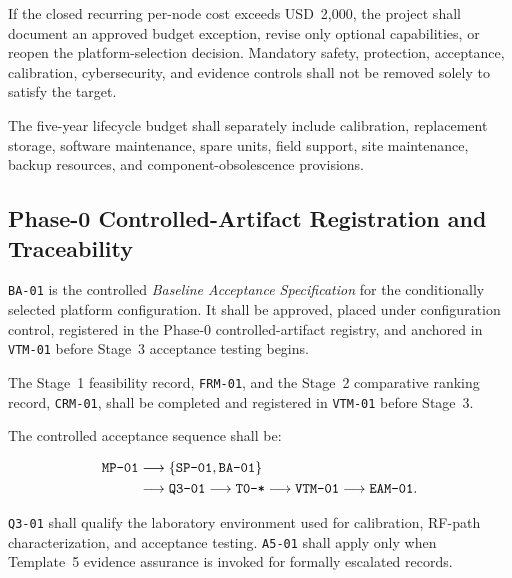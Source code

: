 \documentclass[11pt,a4paper]{article}
\begin{document}
\begin{itemize}[leftmargin=*]
		If the closed recurring per-node cost exceeds USD~2,000, the project shall
		document an approved budget exception, revise only optional capabilities,
		or reopen the platform-selection decision. Mandatory safety, protection,
		acceptance, calibration, cybersecurity, and evidence controls shall not be
		removed solely to satisfy the target.
		
		The five-year lifecycle budget shall separately include calibration,
		replacement storage, software maintenance, spare units, field support,
		site maintenance, backup resources, and component-obsolescence provisions.
		
	\end{itemize}
	
	\subsection*{Phase-0 Controlled-Artifact Registration and Traceability}
	
	\texttt{BA-01} is the controlled \emph{Baseline Acceptance Specification} for
	the conditionally selected platform configuration. It shall be approved,
	placed under configuration control, registered in the Phase-0
	controlled-artifact registry, and anchored in \texttt{VTM-01} before Stage~3
	acceptance testing begins.
	
	The Stage~1 feasibility record, \texttt{FRM-01}, and the Stage~2 comparative
	ranking record, \texttt{CRM-01}, shall be completed and registered in
	\texttt{VTM-01} before Stage~3.
	
	The controlled acceptance sequence shall be:
	
	\[
	\begin{aligned}
		\text{\texttt{MP-01}}
		&\longrightarrow
		\left\{
		\text{\texttt{SP-01}},
		\text{\texttt{BA-01}}
		\right\} \\
		&\longrightarrow
		\text{\texttt{Q3-01}}
		\longrightarrow
		\text{\texttt{T0-*}}
		\longrightarrow
		\text{\texttt{VTM-01}}
		\longrightarrow
		\text{\texttt{EAM-01}}.
	\end{aligned}
	\]
	
	\texttt{Q3-01} shall qualify the laboratory environment used for calibration,
	RF-path characterization, and acceptance testing. \texttt{A5-01} shall apply
	only when Template~5 evidence assurance is invoked for formally escalated
	records.
	
\end{document}
